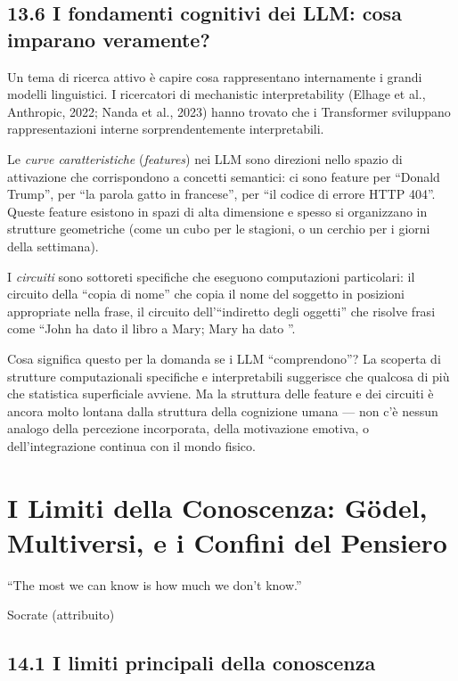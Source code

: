 \documentclass[11.5pt,a4paper,openany]{book}
\theoremstyle{remark}
\begin{document}
\section{13.6 I fondamenti cognitivi dei LLM: cosa imparano veramente?}

Un tema di ricerca attivo è capire cosa rappresentano internamente i grandi modelli linguistici. I ricercatori di mechanistic interpretability (Elhage et al., Anthropic, 2022; Nanda et al., 2023) hanno trovato che i Transformer sviluppano rappresentazioni interne sorprendentemente interpretabili.

Le \textit{curve caratteristiche} (\textit{features}) nei LLM sono direzioni nello spazio di attivazione che corrispondono a concetti semantici: ci sono feature per ``Donald Trump'', per ``la parola gatto in francese'', per ``il codice di errore HTTP 404''. Queste feature esistono in spazi di alta dimensione e spesso si organizzano in strutture geometriche (come un cubo per le stagioni, o un cerchio per i giorni della settimana).

I \textit{circuiti} sono sottoreti specifiche che eseguono computazioni particolari: il circuito della ``copia di nome'' che copia il nome del soggetto in posizioni appropriate nella frase, il circuito dell'``indiretto degli oggetti'' che risolve frasi come ``John ha dato il libro a Mary; Mary ha dato \textvisiblespace''.

Cosa significa questo per la domanda se i LLM ``comprendono''? La scoperta di strutture computazionali specifiche e interpretabili suggerisce che qualcosa di più che statistica superficiale avviene. Ma la struttura delle feature e dei circuiti è ancora molto lontana dalla struttura della cognizione umana --- non c'è nessun analogo della percezione incorporata, della motivazione emotiva, o dell'integrazione continua con il mondo fisico.

\chapter{I Limiti della Conoscenza: Gödel, Multiversi, e i Confini del Pensiero}

\epigraph{``The most we can know is how much we don't know.''}{Socrate (attribuito)}

\section{14.1 I limiti principali della conoscenza}
\end{document}
